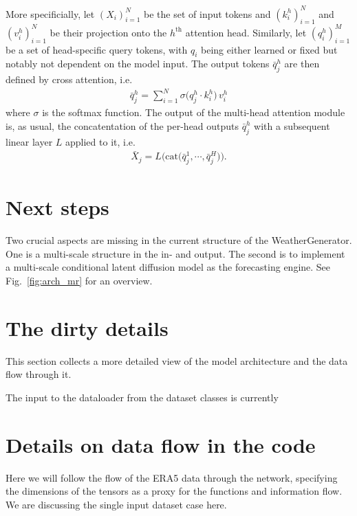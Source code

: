 \documentclass{article}
\begin{document}
More specificially, let $( X_i )_{i=1}^N$ be the set of input tokens and $( k_i^h )_{i=1}^N$ and $( v_i^h )_{i=1}^N$ be their projection onto the $h^{\textrm{th}}$ attention head.
Similarly, let $( q_i^h )_{i=1}^M$ be a set of head-specific query tokens, with $q_i$ being either learned or fixed but notably not dependent on the model input. 
The output tokens $\bar{q}_j^h$ are then defined by cross attention, i.e.
\begin{align}
  \bar{q}_j^h = \sum_{i=1}^N \sigma \big( q_j^h \cdot k_i^h \big) \, v_i^h 
\end{align}
where $\sigma$ is the softmax function.
The output of the multi-head attention module is, as usual, the concatentation of the per-head outputs $\bar{q}_j^h$ with a subsequent linear layer $L$ applied to it, i.e.
\begin{align}
  \bar{X}_j = L \big( \mathrm{cat}\big( \bar{q}_j^1 , \cdots , \bar{q}_j^H \big) \big) .
\end{align}

\section{Next steps}
\label{sec:next_steps}

Two crucial aspects are missing in the current structure of the WeatherGenerator. 
One is a multi-scale structure in the in- and output. 
The second is to implement a multi-scale conditional latent diffusion model as the forecasting engine.
See Fig.~\ref{fig:arch_mr} for an overview.

\section{The dirty details}

This section collects a more detailed view of the model architecture and the data flow through it. 

The input to the dataloader from the dataset classes is currently 
\section{Details on data flow in the code}
Here we will follow the flow of the ERA5 data through the network, specifying the dimensions of the tensors as a proxy for the functions and information flow. We are discussing the single input dataset case here.
\end{document}
